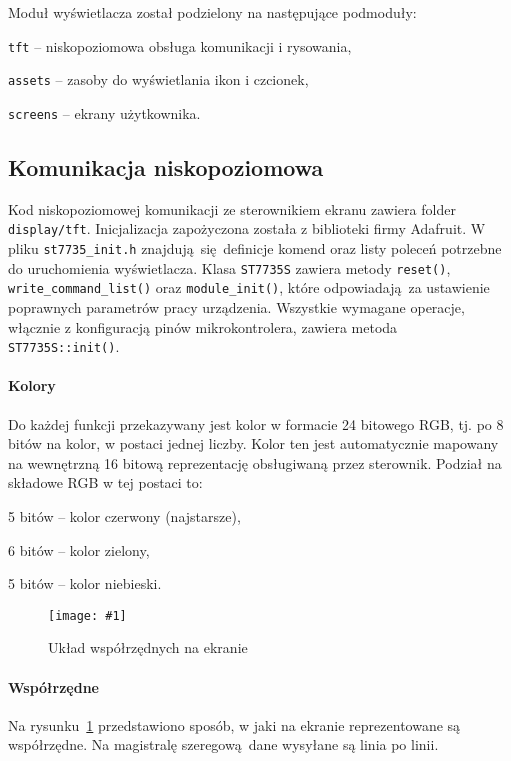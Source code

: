 \documentclass[12pt]{report}
\let\tempone\itemize
\let\temptwo\enditemize
\renewenvironment{itemize}{\tempone\setlength{\itemsep}{0cm}}{\temptwo}
\newcommand{\imgint}[4]{
	\begin{figure}[{#4}]
		\centering
		\texttt{[image: \#1]}
		\caption{#2}
		\label{#1}
	\end{figure}
}
\newcommand{\imgh}[3]{\imgint{#1}{#2}{#3}{H}}
\begin{document}
		\noindent
		Moduł wyświetlacza został podzielony na następujące podmoduły:
		\begin{itemize}
			\item \lstinline|tft| -- niskopoziomowa obsługa komunikacji i rysowania,
			\item \lstinline|assets| -- zasoby do wyświetlania ikon i czcionek,
			\item \lstinline|screens| -- ekrany użytkownika.
		\end{itemize}
		
		\subsection{Komunikacja niskopoziomowa}
			Kod niskopoziomowej komunikacji ze sterownikiem ekranu zawiera folder \lstinline|display/tft|. Inicjalizacja zapożyczona została z biblioteki firmy Adafruit. W pliku \lstinline|st7735_init.h| znajdują się definicje komend oraz listy poleceń potrzebne do uruchomienia wyświetlacza. Klasa \lstinline|ST7735S| zawiera metody \lstinline|reset()|, \lstinline|write_command_list()| oraz \lstinline|module_init()|, które odpowiadają za ustawienie poprawnych parametrów pracy urządzenia. Wszystkie wymagane operacje, włącznie z konfiguracją pinów mikrokontrolera, zawiera metoda \lstinline|ST7735S::init()|.
			
		\paragraph{Kolory}
			Do każdej funkcji przekazywany jest kolor w formacie 24 bitowego RGB, tj. po 8 bitów na kolor, w postaci jednej liczby. Kolor ten jest automatycznie mapowany na wewnętrzną 16 bitową reprezentację obsługiwaną przez sterownik. Podział na składowe RGB w tej postaci to:
			\begin{itemize}
				\item 5 bitów -- kolor czerwony (najstarsze),
				\item 6 bitów -- kolor zielony,
				\item 5 bitów -- kolor niebieski.
			\end{itemize}
		
		\imgh{3/PicoRadio-screen-xy}{Układ współrzędnych na ekranie}{0.45}
		\paragraph{Współrzędne}
			Na rysunku~\ref{3/PicoRadio-screen-xy} przedstawiono sposób, w jaki na ekranie reprezentowane są współrzędne. Na magistralę szeregową dane wysyłane są linia po linii.
		
\end{document}
